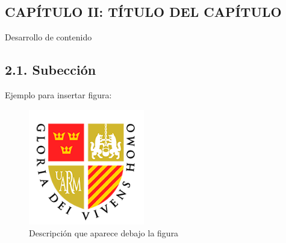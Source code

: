 \medspace
\vspace{1.5cm}
\begin{center}
	\section*{\large CAPÍTULO II: TÍTULO DEL CAPÍTULO}
\end{center}

\vspace{1cm}

Desarrollo de contenido
\subsection*{\normalsize 2.1.  Subección}

Ejemplo para insertar figura:

\begin{figure}[h!]
	\centering
	\includegraphics[width=0.45\textwidth]{Logos_Ruiz/logoruiz_insignia}
	\caption[Descripción que aparece en el índice de figuras]{Descripción que aparece debajo la figura}
	\label{fig:insignia_ruiz}
\end{figure}

